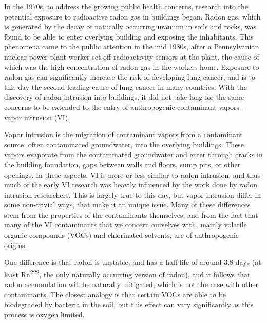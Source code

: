In the 1970s, to address the growing public health concerns, research into the potential exposure to radioactive radon gas in buildings began.
Radon gas, which is generated by the decay of naturally occurring uranium in soils and rocks, was found to be able to enter overlying building and exposing the inhabitants.
This phenomena came to the public attention in the mid 1980s, after a Pennsylvanian nuclear power plant worker set off radioactivity sensors at the plant, the cause of which was the high concentration of radon gas in the workers home\cite{noauthor_health_nodate}.
Exposure to radon gas can significantly increase the risk of developing lung cancer, and is to this day the second leading cause of lung cancer in many countries\cite{gaskin_janet_global_nodate}.
With the discovery of radon intrusion into buildings, it did not take long for the same concerns to be extended to the entry of anthropogenic contaminant vapors - vapor intrusion (VI).\par

Vapor intrusion is the migration of contaminant vapors from a contaminant source, often contaminated groundwater, into the overlying buildings.
These vapors evaporate from the contaminated groundwater and enter through cracks in the building foundation, gaps between walls and floors, sump pits, or other openings\cite{u.s._environmental_protection_agency_oswer_2015}.
In these aspects, VI is more or less similar to radon intrusion, and thus much of the early VI research was heavily influenced by the work done by radon intrusion researchers.
This is largely true to this day, but vapor intrusion differ in some non-trivial ways, that make it an unique issue.
Many of these differences stem from the properties of the contaminants themselves, and from the fact that many of the VI contaminants that we concern ourselves with, mainly volatile organic compounds (VOCs) and chlorinated solvents, are of anthropogenic origins.\par

One difference is that radon is unstable, and has a half-life of around 3.8 days (at least Rn\textsuperscript{222}, the only naturally occurring version of radon), and it follows that radon accumulation will be naturally mitigated, which is not the case with other contaminants\cite{schumacher_fluctuation_2012}.
The closest analogy is that certain VOCs are able to be biodegraded by bacteria in the soil, but this effect can vary significantly as this process is oxygen limited\cite{u.s._environmental_protection_agency_oswer_2015,abreu_simulating_2006}.\par

